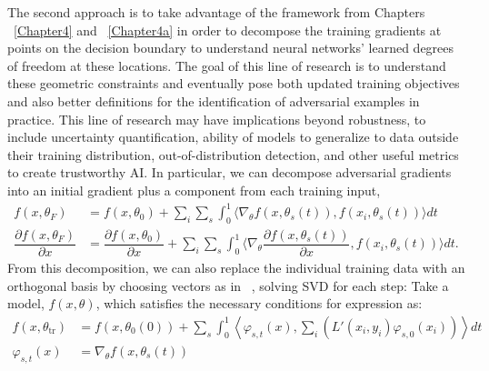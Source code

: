       The second approach is to take advantage of the framework from Chapters ~\ref{Chapter4} and ~\ref{Chapter4a} in order to decompose the training gradients at points on the decision boundary to understand neural networks' learned degrees of freedom at these locations. The goal of this line of research is to understand these geometric constraints and eventually pose both updated training objectives and also better definitions for the identification of adversarial examples in practice. This line of research may have implications beyond robustness, to include uncertainty quantification, ability of models to generalize to data outside their training distribution, 
out-of-distribution detection, and other useful metrics to create
trustworthy AI. In particular, we can decompose adversarial gradients into an
initial gradient plus a component from each training input,
\begin{align}
  f(x, \theta_F) &= f(x, \theta_0) + \sum_i \sum_s \int_0^1 \langle
  \nabla_\theta f(x, \theta_s(t)), f(x_i, \theta_s(t))\rangle dt \\
  \dfrac{\partial f(x, \theta_F)}{\partial x} &= \dfrac{\partial f(x, \theta_0)}{\partial x} + \sum_i \sum_s \int_0^1 \langle
  \nabla_\theta \dfrac{\partial f(x, \theta_s(t))}{\partial x}, f(x_i,
                                 \theta_s(t))\rangle dt.
\end{align}
From this decomposition, we can also replace the individual training
data with an orthogonal basis by choosing vectors as in
~\citet{halko2011finding}, solving SVD for each step:
    Take a model, $f(x, \theta)$, which satisfies the necessary conditions for expression as:
 \begin{align}
     f(x, \theta_\text{tr}) &= f(x, \theta_0(0)) +  \sum_s
\int_0^1                                  \left\langle 
                                   \varphi_{s,t}(x) , \sum_i
                                   \left(L'(x_i, y_i) \varphi_{s,
                                   0}(x_i)\right) \right \rangle dt\\
     \varphi_{s,t}(x) &= \nabla_\theta f(x, \theta_s(t))
 \end{align}


